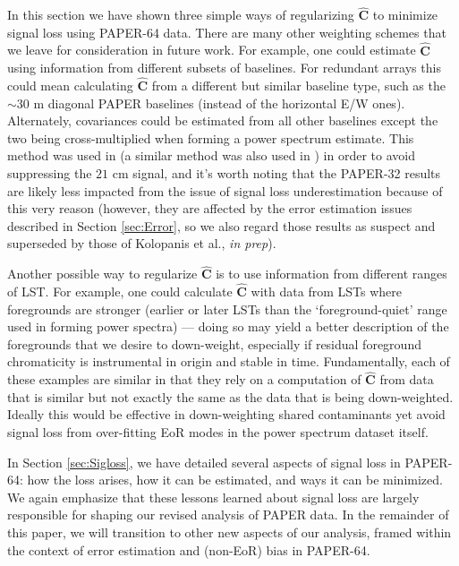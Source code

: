 \documentclass[preprint2,numberedappendix,tighten]{aastex6}  %
\begin{document}
In this section we have shown three simple ways of regularizing $\widehat{\textbf{C}}$ to minimize signal loss using PAPER-64 
data. There are many other weighting schemes that we leave for consideration in future work. For example, one could estimate 
$\widehat{\textbf{C}}$ using information from different subsets of baselines. For redundant arrays this could mean calculating $
\widehat{\textbf{C}}$ from a different but similar baseline type, such as the $\sim30$ m diagonal PAPER baselines (instead of the 
horizontal E/W ones). Alternately, covariances could be estimated from all other baselines except the two being cross-multiplied 
when forming a power spectrum estimate. This method was used in \citet{parsons_et_al2014} (a similar method was also used in \citet{dillon_et_al2015}) in order to avoid suppressing the 
$21$ cm signal, and it's worth noting that the PAPER-32 results are likely less impacted from the issue of signal loss underestimation 
because of this very reason (however, they are affected by the error estimation issues described in Section \ref{sec:Error}, so 
we also regard those results as suspect and superseded by those of Kolopanis et al., \textit{in prep}).

Another possible way to regularize $\widehat{\textbf{C}}$ is to use information from different ranges of LST. For example, one could 
calculate $\widehat{\textbf{C}}$ with data from LSTs where foregrounds are stronger (earlier or later LSTs than the `foreground-quiet' range used in forming power spectra) --- doing so may yield a better description of the foregrounds that we desire to 
down-weight, especially if residual foreground chromaticity is instrumental in origin and stable in time. Fundamentally, each of these examples are similar in that they rely on a computation of $\widehat{\textbf{C}}$ from 
data that is similar but not exactly the same as the data that is being down-weighted. Ideally this would be effective in down-weighting shared contaminants yet avoid signal loss from over-fitting EoR modes in the power spectrum dataset itself. 

In Section \ref{sec:Sigloss}, we have detailed several aspects of signal loss in PAPER-64: how the loss arises, how it can be estimated, and ways it can be minimized. We again emphasize that these lessons learned about signal loss are largely responsible for shaping our revised analysis of PAPER data. In the remainder of this paper, we will transition to other new aspects of our analysis, framed within the context of error estimation and (non-EoR) bias in PAPER-64.
\end{document}
